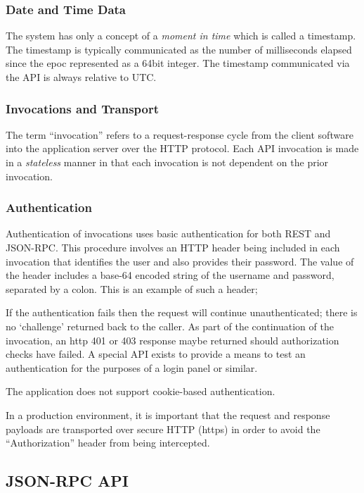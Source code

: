 \subsubsection{Date and Time Data}

The system has only a concept of a {\it moment in time} which is called a timestamp.  The timestamp is typically communicated as the number of milliseconds elapsed since the epoc represented as a 64bit integer.  The timestamp communicated via the API is always relative to UTC.

\subsubsection{Invocations and Transport}

The term ``invocation'' refers to a request-response cycle from the client software into the application server over the HTTP protocol.  Each API invocation is made in a {\it stateless} manner in that each invocation is not dependent on the prior invocation.

\subsubsection{Authentication}

Authentication of invocations uses basic authentication for both REST and JSON-RPC.  This procedure involves an HTTP header being included in each invocation that identifies the user and also provides their password.  The value of the header includes a base-64 encoded string of the username and password, separated by a colon.  This is an example of such a header;


If the authentication fails then the request will continue unauthenticated; there is no `challenge' returned back to the caller.  As part of the continuation of the invocation, an http 401 or 403 response maybe returned should authorization checks have failed.  A special API exists to provide a means to test an authentication for the purposes of a login panel or similar.

The application does not support cookie-based authentication.

In a production environment, it is important that the request and response payloads are transported over secure HTTP (https) in order to avoid the ``Authorization'' header from being intercepted.

\subsection{JSON-RPC API}

